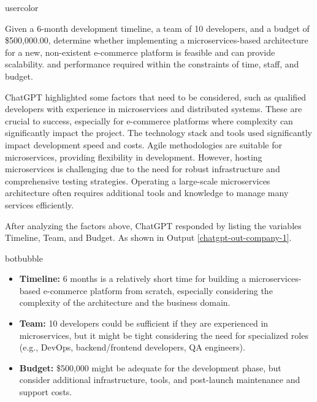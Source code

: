 \begin{chatin}{usercolor}{}

Given a 6-month development timeline, a team of 10 developers, and a budget of \$500,000.00, determine whether implementing a microservices-based architecture for a new, non-existent e-commerce platform is feasible and can provide scalability. and performance required within the constraints of time, staff, and budget.
\end{chatin}
    
ChatGPT highlighted some factors that need to be considered, such as qualified developers with experience in microservices and distributed systems. These are crucial to success, especially for e-commerce platforms where complexity can significantly impact the project. The technology stack and tools used significantly impact development speed and costs. Agile methodologies are suitable for microservices, providing flexibility in development. However, hosting microservices is challenging due to the need for robust infrastructure and comprehensive testing strategies. Operating a large-scale microservices architecture often requires additional tools and knowledge to manage many services efficiently.

After analyzing the factors above, ChatGPT responded by listing the variables Timeline, Team, and Budget. As shown in Output \ref{chatgpt-out-company-1}.

\begin{chatout}{botbubble}{}
\begin{itemize}
    \item \textbf{Timeline:} 6 months is a relatively short time for building a microservices-based e-commerce platform from scratch, especially considering the complexity of the architecture and the business domain.    
    \item \textbf{Team:} 10 developers could be sufficient if they are experienced in microservices, but it might be tight considering the need for specialized roles (e.g., DevOps, backend/frontend developers, QA engineers).    
    \item \textbf{Budget:} \$500,000 might be adequate for the development phase, but consider additional infrastructure, tools, and post-launch maintenance and support costs.
\end{itemize}
\end{chatout}
    
\begin{center}
                       
\end{center}

